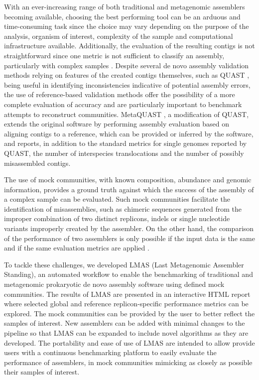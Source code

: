 With an ever-increasing range of both traditional and metagenomic assemblers becoming available, choosing the best performing tool can be an arduous and time-consuming task since the choice may vary depending on the purpose of the analysis, organism of interest, complexity of the sample and computational infrastructure available. Additionally, the evaluation of the resulting contigs is not straightforward since one metric is not sufficient to classify an assembly, particularly with complex samples \cite{olson_metagenomic_2019,bradnam_assemblathon_2013}. Despite several de novo assembly validation methods relying on features of the created contigs themselves, such as QUAST \cite{gurevich_quast_2013}, being useful in identifying inconsistencies indicative of potential assembly errors, the use of reference-based validation methods offer the possibility of a more complete evaluation of accuracy and are particularly important to benchmark attempts to reconstruct communities. MetaQUAST \cite{bradnam_assemblathon_2013}, a modification of QUAST, extends the original software by performing assembly evaluation based on aligning contigs to a reference, which can be provided or inferred by the software, and reports, in addition to the standard metrics for single genomes reported by QUAST, the number of interspecies translocations and the number of possibly misassembled contigs.

The use of mock communities, with known composition, abundance and genomic information, provides a ground truth against which the success of the assembly of a complex sample can be evaluated. Such mock communities facilitate the identification of misassemblies, such as chimeric sequences generated from the improper combination of two distinct replicons, indels or single nucleotide variants improperly created by the assembler. On the other hand, the comparison of the performance of two assemblers is only possible if the input data is the same and if the same evaluation metrics are applied \cite{sczyrba_critical_2017}. 

To tackle these challenges, we developed LMAS (Last Metagenomic Assembler Standing), an automated workflow to enable the benchmarking of traditional and metagenomic prokaryotic de novo assembly software using defined mock communities. The results of LMAS are presented in an interactive HTML report where selected global and reference replicon-specific performance metrics can be explored. The mock communities can be provided by the user to better reflect the samples of interest. New assemblers can be added with minimal changes to the pipeline so that LMAS can be expanded to include novel algorithms as they are developed. The portability and ease of use of LMAS are intended to allow provide users with a continuous benchmarking platform to easily evaluate the performance of assemblers, in mock communities mimicking as closely as possible their samples of interest.


